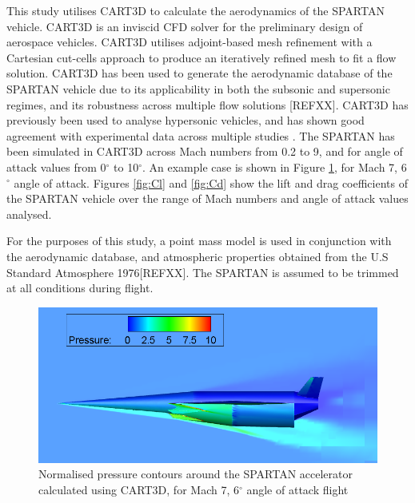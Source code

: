 \documentclass{article}
\begin{document}
 This study utilises CART3D to calculate the aerodynamics of the SPARTAN vehicle\cite{CART3D}. CART3D is an inviscid CFD solver for the preliminary design of aerospace vehicles. CART3D utilises adjoint-based mesh refinement with a Cartesian cut-cells approach to produce an iteratively refined mesh to fit a flow solution\cite{Aftosmis1997}. CART3D has been used to generate the aerodynamic database of the SPARTAN vehicle due to its applicability in both the subsonic and supersonic regimes, and its robustness across multiple flow solutions [REFXX]. CART3D has previously been used to analyse hypersonic vehicles, and has shown good agreement with experimental data across multiple studies \cite{Sagerman2017,Aftosmis2011}. The SPARTAN has been simulated in CART3D across Mach numbers from 0.2 to 9, and for angle of attack values from 0$^\circ$ to 10$^\circ$. An example case is shown in Figure \ref{fig:M7AoA6}, for Mach 7, 6$^\circ$ angle of attack. Figures \ref{fig:Cl} and \ref{fig:Cd} show the lift and drag coefficients of the SPARTAN vehicle over the range of Mach numbers and angle of attack values analysed. 
 
 For the purposes of this study, a point mass model is used in conjunction with the aerodynamic database, and atmospheric properties obtained from the U.S Standard Atmosphere 1976[REFXX]. The SPARTAN is assumed to be trimmed at all conditions during flight.
 
 \begin{figure}
 	\centering
 	\includegraphics[width=0.7\linewidth]{Figures/M7AoA6}
 	\caption{Normalised pressure contours around the SPARTAN accelerator calculated using CART3D, for Mach 7, 6$^\circ$ angle of attack flight}
 	\label{fig:M7AoA6}
 \end{figure}
\end{document}

